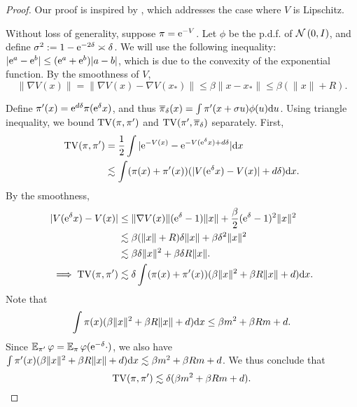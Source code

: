 \begin{proof}
Our proof is inspired by \citet[Lem. 6.4]{lee2023convergence}, which addresses the case where $V$ is Lipschitz.

Without loss of generality, suppose $\pi=\mathrm{e}^{-V}$. Let $\phi$ be the p.d.f. of $\operatorname{\mathcal{N}}\left(0,I\right)$, and define $\sigma^2:=1-\mathrm{e}^{-2\delta}\asymp\delta$. We will use the following inequality: $|\mathrm{e}^a-\mathrm{e}^b|\le(\mathrm{e}^a+\mathrm{e}^b)|a-b|$, which is due to the convexity of the exponential function. By the smoothness of $V$, 
$$\|\nabla V(x)\|=\|\nabla V(x)-\nabla V(x_*)\|\le\beta\|x-x_*\|\le\beta(\|x\|+R).$$

Define $\pi'(x)=\mathrm{e}^{d\delta}\pi(\mathrm{e}^\delta x)$, and thus $\overline{\pi}_\delta(x)=\int\pi'(x+\sigma u)\phi(u)\mathrm{d} u$. Using triangle inequality, we bound $\operatorname{TV}(\pi,\pi')$ and $\operatorname{TV}(\pi',\overline{\pi}_\delta)$ separately. First,
\begin{align*}
    \operatorname{TV}(\pi,\pi')&=\frac{1}{2}\int|\mathrm{e}^{-V(x)}-\mathrm{e}^{-V(\mathrm{e}^\delta x)+d\delta}|\mathrm{d} x\\
    &\lesssim\int(\pi(x)+\pi'(x))(|V(\mathrm{e}^\delta x)-V(x)|+d\delta)\mathrm{d} x.
\end{align*}
By the smoothness,
\begin{align*}
    |V(\mathrm{e}^\delta x)-V(x)|&\le\|\nabla V(x)\|(\mathrm{e}^\delta-1)\|x\|+\frac{\beta}{2}(\mathrm{e}^\delta-1)^2\|x\|^2\\
    &\lesssim\beta(\|x\|+R)\delta\|x\|+\beta\delta^2\|x\|^2\\
    &\lesssim\beta\delta\|x\|^2+\beta\delta R\|x\|.\\
    \implies\operatorname{TV}(\pi,\pi')&\lesssim\delta\int(\pi(x)+\pi'(x))(\beta\|x\|^2+\beta R\|x\|+d)\mathrm{d} x.
\end{align*}
Note that 
$$\int\pi(x)(\beta\|x\|^2+\beta R\|x\|+d)\mathrm{d} x\le\beta m^2+\beta Rm+d.$$
Since $\operatorname{\mathbb{E}}_{\pi'}\varphi=\operatorname{\mathbb{E}}_{\pi}\varphi(\mathrm{e}^{-\delta}\cdot)$, we also have $\int\pi'(x)(\beta\|x\|^2+\beta R\|x\|+d)\mathrm{d} x\lesssim\beta m^2+\beta Rm+d$. We thus conclude that
$$\operatorname{TV}(\pi,\pi')\lesssim\delta(\beta m^2+\beta Rm+d).$$


\end{proof}
